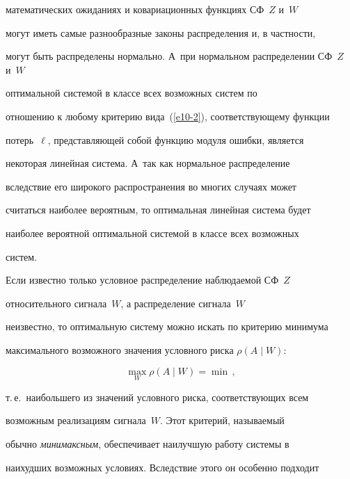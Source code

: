 математических ожиданиях и ковариационных функциях СФ~$Z$ и~$W$


могут иметь самые разнообразные законы распределения и, в част\-ности,


могут быть распределены нормально. А~при нормальном распределении СФ~$Z$ и~$W$ 


оптимальной системой в классе всех возможных систем по


отношению к любому критерию вида~(\ref{e10-2}), соответствующему функции


потерь~$\ell$, представляющей собой функцию модуля ошибки, является


некоторая линейная система. А~так как нормальное распределение


вследствие его широкого распространения во многих случаях может


считаться наиболее вероятным, то оптимальная линейная система будет


наиболее вероятной оптимальной системой в классе всех возможных


\mbox{систем}.


{ %





}





Если известно только условное распределение наблюдаемой СФ~$Z$


относительного сигнала~$W$, а распределение сигнала~$W$


неизвестно, то оптимальную систему можно искать по критерию минимума


максимального возможного значения условного риска  $\rho (A\mid W)$:


\begin{equation*}


\max\limits_W \rho (A\mid W) =\min \,,




\end{equation*}


т.\,е.\ наибольшего из значений условного риска, соответствующих всем


возможным реализациям сигнала~$W$. Этот критерий, называемый


обычно \textit{минимаксным}, обеспечивает наилучшую работу системы в


наихудших возможных условиях. Вследствие этого он особенно подходит


